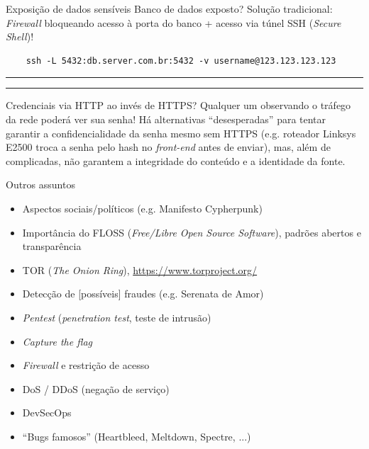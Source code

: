 \documentclass[utf8]{beamer}
\begin{document}
\begin{frame}[fragile]{Exposição de dados sensíveis}
  Banco de dados exposto?
  Solução tradicional:
  \emph{Firewall} bloqueando acesso à porta do banco
  + acesso via túnel SSH (\emph{Secure Shell})!
  \begin{verbatim}
    ssh -L 5432:db.server.com.br:5432 -v username@123.123.123.123
  \end{verbatim}
  \vfill\hrule\vspace{2pt}\hrule\vfill
  \centering
  Credenciais via HTTP ao invés de HTTPS?
  Qualquer um observando o tráfego da rede poderá ver sua senha!
  Há alternativas ``desesperadas''
  para tentar garantir a confidencialidade da senha
  mesmo sem HTTPS
  (e.g. roteador Linksys E2500
        troca a senha pelo hash no \emph{front-end}
        antes de enviar),
  mas, além de complicadas,
  não garantem a integridade do conteúdo e a identidade da fonte.
\end{frame}


\begin{frame}{Outros assuntos}
  \begin{itemize}
    \item Aspectos sociais/políticos (e.g. Manifesto Cypherpunk)
    \item Importância do FLOSS
          (\emph{Free/Libre Open Source Software}),
          padrões abertos e transparência
    \item TOR (\emph{The Onion Ring}),
          \url{https://www.torproject.org/}
    \item Detecção de [possíveis] fraudes (e.g. Serenata de Amor)
    \item \emph{Pentest} (\emph{penetration test}, teste de intrusão)
    \item \emph{Capture the flag}
    \item \emph{Firewall} e restrição de acesso
    \item DoS / DDoS (negação de serviço)
    \item DevSecOps
    \item ``Bugs famosos'' (Heartbleed, Meltdown, Spectre, ...)
  \end{itemize}
\end{frame}
\end{document}
